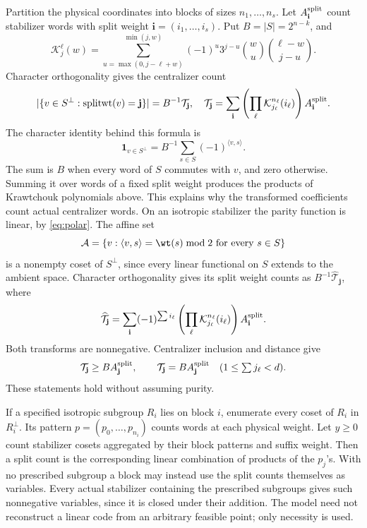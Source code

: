 Partition the physical coordinates into blocks of sizes
\(n_1,\ldots,n_s\). Let \(A^{\rm split}_{\mathbf i}\) count stabilizer words with
split weight \(\mathbf i=(i_1,\ldots,i_s)\). Put \(B=|S|=2^{n-k}\), and
\[
 \mathcal{K}_j^{\ell}(w)=\sum_{u=\max(0,j-\ell+w)}^{\min(j,w)}
          (-1)^u3^{j-u}\binom wu\binom{\ell-w}{j-u}.
\]
Character orthogonality gives the centralizer count
\[
 |\{v\in S^\perp:\operatorname{splitwt}(v)=\mathbf j\}|
 =B^{-1}\mathcal T_{\mathbf j},\quad
 \mathcal T_{\mathbf j}=\sum_{\mathbf i}
       \left(\prod_\ell \mathcal{K}_{j_\ell}^{n_\ell}(i_\ell)\right)A^{\rm split}_{\mathbf i}.
\]
The character identity behind this formula is
\[
 \mathbf 1_{v\in S^\perp}=B^{-1}\sum_{s\in S}(-1)^{\langle v,s\rangle}.
\]
The sum is \(B\) when every word of \(S\) commutes with \(v\),
and zero otherwise. Summing it over words of a fixed split weight
produces the products of Krawtchouk polynomials above. This explains why
the transformed coefficients count actual centralizer words.
On an isotropic stabilizer the parity function is linear, by
\eqref{eq:polar}. The affine set
\[
 \mathcal A=\{v:\langle v,s\rangle=\wt(s)\bmod2
                          \text{ for every }s\in S\}
\]
is a nonempty coset of \(S^\perp\), since every linear functional on
\(S\) extends to the ambient space. Character orthogonality gives its
split weight counts as \(B^{-1}\widehat{\mathcal T}_{\mathbf j}\), where
\[
 \widehat{\mathcal T}_{\mathbf j}=\sum_{\mathbf i}(-1)^{\sum i_\ell}
       \left(\prod_\ell \mathcal{K}_{j_\ell}^{n_\ell}(i_\ell)\right)A^{\rm split}_{\mathbf i}.
\]
Both transforms are nonnegative. Centralizer inclusion and distance give
\[
 \mathcal T_{\mathbf j}\geq BA^{\rm split}_{\mathbf j},\qquad
 \mathcal T_{\mathbf j}=BA^{\rm split}_{\mathbf j}\quad(1\leq\textstyle\sum j_\ell<d).
\]
These statements hold without assuming purity.

If a specified isotropic subgroup \(R_i\) lies on block \(i\), enumerate
every coset of \(R_i\) in \(R_i^\perp\). Its pattern
\(p=(p_0,\ldots,p_{n_i})\) counts words at each physical weight.
Let \(y\geq0\) count stabilizer cosets aggregated by their block
patterns and suffix weight. Then a split count is the corresponding
linear combination of products of the \(p_j\)'s.
With no prescribed subgroup a block may instead use the split counts
themselves as variables. Every actual stabilizer containing the prescribed
subgroups gives such nonnegative variables, since it is closed under their
addition. The model need not reconstruct a linear code from an arbitrary
feasible point; only necessity is used.

